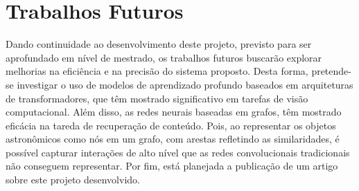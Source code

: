 \section{Trabalhos Futuros}
Dando continuidade ao desenvolvimento deste projeto, previsto para ser aprofundado em nível de mestrado, os trabalhos futuros buscarão explorar melhorias na eficiência e na precisão do sistema proposto. Desta forma, pretende-se investigar o uso de modelos de aprendizado profundo baseados em arquiteturas de transformadores, que têm mostrado significativo em tarefas de visão computacional.  Além disso, as redes neurais baseadas em grafos, têm mostrado eficácia na tareda de recuperação de conteúdo. Pois, ao representar os objetos astronômicos como nós em um grafo, com arestas refletindo as similaridades, é possível capturar interações de alto nível que as redes convolucionais tradicionais não conseguem representar. Por fim, está planejada a publicação de um artigo sobre este projeto desenvolvido.









